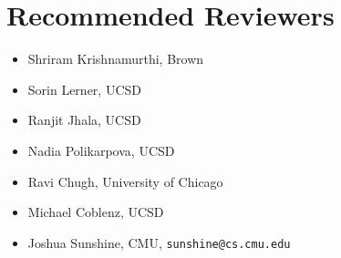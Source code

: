 \section*{Recommended Reviewers}


\begin{itemize}
  \item Shriram Krishnamurthi, Brown
  \item Sorin Lerner, UCSD
  \item Ranjit Jhala, UCSD
  \item Nadia Polikarpova, UCSD
  \item Ravi Chugh, University of Chicago
  \item Michael Coblenz, UCSD
  \item Joshua Sunshine, CMU, {\tt sunshine@cs.cmu.edu} 
\end{itemize}

\iflater
{}
\fi
